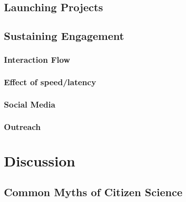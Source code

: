 \documentclass{sigchi}
\begin{document}
\subsection{Launching Projects}

\subsection{Sustaining Engagement}


\subsubsection{Interaction Flow}

\subsubsection{Effect of speed/latency}




\subsubsection{Social Media}

\subsubsection{Outreach}

\section{Discussion}

\subsection{Common Myths of Citizen Science}
\end{document}
